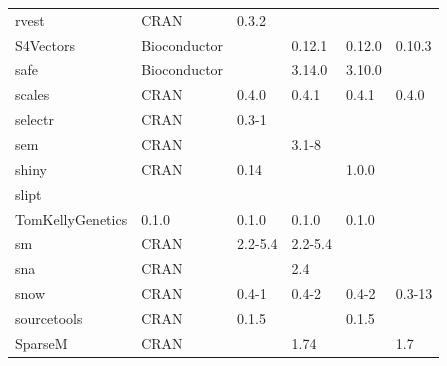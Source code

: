 \begin{longtable}{llllll}
\rowcolor{black!5}
rvest                         & CRAN                      & 0.3.2       &             &                &                    \\
\rowcolor{black!10}
S4Vectors                     & Bioconductor              &             & 0.12.1      & 0.12.0         & 0.10.3            \\
\rowcolor{black!5}
safe                          & Bioconductor              &             & 3.14.0      & 3.10.0         &                    \\
\rowcolor{black!10}
scales                        & CRAN                      & 0.4.0       & 0.4.1       & 0.4.1          & 0.4.0             \\
\rowcolor{black!5}
selectr                       & CRAN                      & 0.3-1       &             &                &                    \\
\rowcolor{black!10}
sem                           & CRAN                      &             & 3.1-8       &                &                   \\
\rowcolor{black!5}
shiny                         & CRAN                      & 0.14        &             & 1.0.0          &                    \\
\rowcolor{black!10}
slipt                         & \begin{tabular}[c]{@{}l@{}}GitHub \\ TomKellyGenetics \end{tabular}  & 0.1.0       & 0.1.0       & 0.1.0          & 0.1.0             \\
\rowcolor{black!5}
sm                            & CRAN                      & 2.2-5.4     & 2.2-5.4     &                &                    \\
\rowcolor{black!10}
sna                           & CRAN                      &             & 2.4         &                &                   \\
\rowcolor{black!5}
snow                          & CRAN                      & 0.4-1       & 0.4-2       & 0.4-2          & 0.3-13             \\
\rowcolor{black!10}
sourcetools                   & CRAN                      & 0.1.5       &             & 0.1.5          &                   \\
\rowcolor{black!5}
SparseM                       & CRAN                      &             & 1.74        &                & 1.7                \\

\end{longtable}
